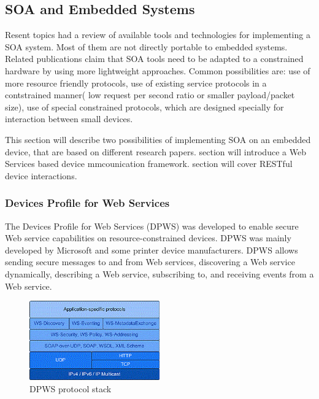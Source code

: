 \subsection{SOA and Embedded Systems}

Resent topics had a review of available tools and technologies for implementing a
\gls{SOA} system. Most of them are not directly portable to embedded systems.
Related publications \cite{5470528, dguinard-rest-vs-ws} claim that SOA
tools need to be adapted to a constrained hardware by using more lightweight approaches.
Common possibilities are: use of more resource friendly protocols, use of
existing service protocols in a contstrained manner( low request per second
ratio or smaller payload/packet size), use of special constrained protocols,
which are designed specially for interaction between small devices.

This section will describe two possibilities of implementing SOA on an embedded
device, that are based on different research
papers\cite{coap_survey,4221180}.
 section will introduce a
Web Services based device mmcounication framework.  section
will cover RESTful device interactions.
\subsubsection{Devices Profile for Web Services}
\label{sec:DPWS}
The Devices Profile for Web Services (DPWS) was developed to enable secure Web
service capabilities on resource-constrained devices\cite{ws4d_dpws}.
DPWS was mainly developed by Microsoft and some printer device manufacturers.
DPWS allows sending secure messages to and from Web services, discovering a Web service dynamically, describing a Web service, subscribing to, and receiving events from a Web service.


\begin{center}
 \begin{figure}[h]
	\centering
	\includegraphics[width=0.5\textwidth]{../images/background/dpws-stack.png}
	\caption{DPWS protocol stack \cite{ws4d_dpws} }
	\label{fig:dpws_protocol_stack}
 \end{figure}
\end{center}


